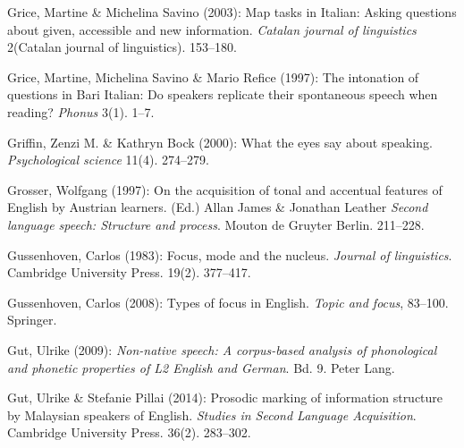 \begin{styleBibliography}
Grice, Martine \& Michelina Savino (2003): Map tasks in Italian: Asking questions about given, accessible and new information. \textit{Catalan journal of linguistics} 2(Catalan journal of linguistics). 153–180.
\end{styleBibliography}

\begin{styleBibliography}
Grice, Martine, Michelina Savino \& Mario Refice (1997): The intonation of questions in Bari Italian: Do speakers replicate their spontaneous speech when reading? \textit{Phonus} 3(1). 1–7.
\end{styleBibliography}

\begin{styleBibliography}
Griffin, Zenzi M. \& Kathryn Bock (2000): What the eyes say about speaking. \textit{Psychological science} 11(4). 274–279.
\end{styleBibliography}

\begin{styleBibliography}
Grosser, Wolfgang (1997): On the acquisition of tonal and accentual features of English by Austrian learners. (Ed.) Allan James \& Jonathan Leather \textit{Second language speech: Structure and process}. Mouton de Gruyter Berlin. 211–228.
\end{styleBibliography}

\begin{styleBibliography}
Gussenhoven, Carlos (1983): Focus, mode and the nucleus. \textit{Journal of linguistics}. Cambridge University Press. 19(2). 377–417.
\end{styleBibliography}

\begin{styleBibliography}
Gussenhoven, Carlos (2008): Types of focus in English. \textit{Topic and focus}, 83–100. Springer.
\end{styleBibliography}

\begin{styleBibliography}
Gut, Ulrike (2009): \textit{Non-native speech: A corpus-based analysis of phonological and phonetic properties of L2 English and German}. Bd. 9. Peter Lang.
\end{styleBibliography}

\begin{styleBibliography}
Gut, Ulrike \& Stefanie Pillai (2014): Prosodic marking of information structure by Malaysian speakers of English. \textit{Studies in Second Language Acquisition}. Cambridge University Press. 36(2). 283–302.
\end{styleBibliography}

